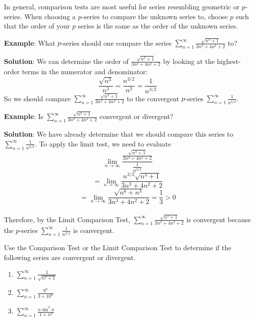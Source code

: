 In general, comparison tests are most useful for series resembling geometric 
or $p$-series. When choosing a $p$-series to compare the unknown series to, 
choose $p$ such that the order of your $p$ series is the same as the order of 
the unknown series.

\textbf{Example}: What $p$-series should one compare the series $\sum_{n=1}^
\infty \frac{\sqrt{n^3 + 1}}{3n^3 + 4n^2 + 2}$ to?

\textbf{Solution}: We can determine the order of $\frac{\sqrt{n^3 + 1}}{3n^3 
+ 4n^2 + 2}$ by looking at the highest-order terms in the numerator and 
denominator:
$$\frac{\sqrt{n^3}}{n^3} = \frac{n^{3/2}}{n^3} = \frac{1}{n^{3/2}}$$
So we should compare $\sum_{n=1}^\infty \frac{\sqrt{n^3 + 1}}{3n^3 + 4n^2 + 2}$ 
to the convergent $p$-series $\sum_{n=1}^\infty \frac{1}{n^{3/2}}$.

\textbf{Example}: Is $\sum_{n=1}^\infty \frac{\sqrt{n^3 + 1}}{3n^3 + 4n^2 + 2}$ 
convergent or divergent?

\textbf{Solution}: We have already determine that we should compare this 
series to $\sum_{n=1}^\infty \frac{1}{n^{3/2}}$. To apply the limit test, 
we need to evaluate
$$\lim_{n \to \infty} \frac{\frac{\sqrt{n^3 + 1}}{3n^3 + 4n^2 + 2}}{\frac{1}{n^
{3/2}}}$$
$$= \lim_{n \to \infty} \frac{n^{3/2} \sqrt{n^3 + 1}}{3n^3 + 4n^2 + 2} $$
$$= \lim_{n \to \infty} \frac{\sqrt{n^6 + n^3}}{3n^3 + 4n^2 + 2} = \frac{1}{3} 
> 0$$\\
Therefore, by the Limit Comparison Test, $\sum_{n=1}^\infty \frac{\sqrt{n^3 + 
1}}{3n^3 + 4n^2 + 2}$ is convergent because the $p$-series $\sum_{n=1}^\infty 
\frac{1}{n^{3/2}}$ is convergent. 

\begin{Exercise}[label = comp1]
Use the Comparison Test or the Limit Comparison Test to determine if the 
following series are convergent or divergent. 
\begin{enumerate}
\item $\sum_{n=1}^\infty \frac{1}{\sqrt{n^2 + 1}}$
\item $\sum_{n=1}^\infty \frac{9^n}{3 + 10^n}$
\item $\sum_{n=1}^\infty \frac{n \sin^2{n}}{1 + n^3}$
\vspace{50mm}
\end{enumerate}
\end{Exercise}

